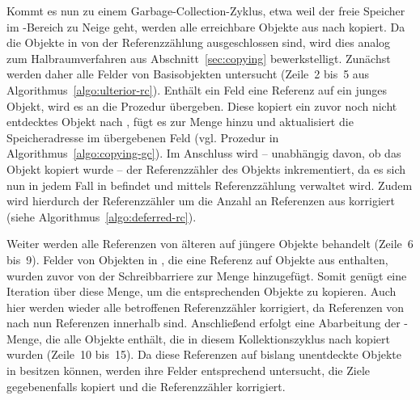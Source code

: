 Kommt es nun zu einem Garbage-Collection-Zyklus, etwa weil der freie Speicher im \Nursery-Bereich zu Neige geht, werden alle erreichbare Objekte aus \Nursery nach \Mature kopiert.
Da die Objekte in \Nursery von der Referenzzählung ausgeschlossen sind, wird dies analog zum Halbraumverfahren aus Abschnitt~\ref{sec:copying} bewerkstelligt.
Zunächst werden daher alle Felder von Basisobjekten untersucht (Zeile~2 bis~5 aus Algorithmus~\ref{algo:ulterior-rc}).
Enthält ein Feld eine Referenz auf ein junges Objekt, wird es an die Prozedur  übergeben.
Diese kopiert ein zuvor noch nicht entdecktes Objekt nach \Mature, fügt es zur Menge  hinzu und aktualisiert die Speicheradresse im übergebenen Feld (vgl. Prozedur  in Algorithmus~\ref{algo:copying-gc}).
Im Anschluss wird -- unabhängig davon, ob das Objekt kopiert wurde -- der Referenzzähler des Objekts inkrementiert, da es sich nun in jedem Fall in \Mature befindet und mittels Referenzzählung verwaltet wird.
Zudem wird hierdurch der Referenzzähler um die Anzahl an Referenzen aus \Roots korrigiert (siehe Algorithmus~\ref{algo:deferred-rc}).

Weiter werden alle Referenzen von älteren auf jüngere Objekte behandelt (Zeile~6 bis~9).
Felder von Objekten in \Mature, die eine Referenz auf Objekte aus \Nursery enthalten, wurden zuvor von der Schreibbarriere zur Menge  hinzugefügt.
Somit genügt eine Iteration über diese Menge, um die entsprechenden Objekte zu kopieren.
Auch hier werden wieder alle betroffenen Referenzzähler korrigiert, da Referenzen von \Mature nach \Nursery nun Referenzen innerhalb \Mature sind.
Anschließend erfolgt eine Abarbeitung der -Menge, die alle Objekte enthält, die in diesem Kollektionszyklus nach \Mature kopiert wurden (Zeile~10 bis~15).
Da diese Referenzen auf bislang unentdeckte Objekte in \Nursery besitzen können, werden ihre Felder entsprechend untersucht, die Ziele gegebenenfalls kopiert und die Referenzzähler korrigiert.

